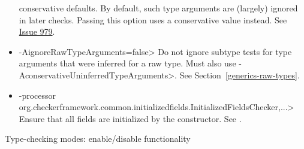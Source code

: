 \begin{itemize}
  conservative defaults.
  By default, such type arguments are (largely) ignored in later
  checks.
  Passing this option uses a conservative value instead.
  See \href{https://github.com/typetools/checker-framework/issues/979}{Issue
  979}.
\item \<-AignoreRawTypeArguments=false>
  Do not ignore subtype tests for type arguments that were inferred for a
  raw type. Must also use \<-AconservativeUninferredTypeArguments>.  See
  Section~\ref{generics-raw-types}.
\item \<-processor org.checkerframework.common.initializedfields.InitializedFieldsChecker,...>
  Ensure that all fields are initialized by the constructor.  See
  .
\end{itemize}

Type-checking modes:  enable/disable functionality
